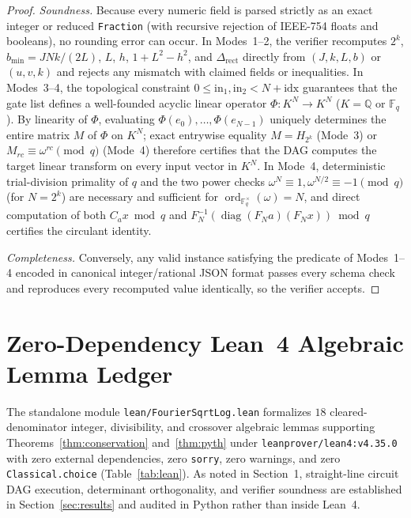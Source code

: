 \documentclass[11pt,a4paper]{article}
\theoremstyle{definition}
\theoremstyle{remark}
\newcommand{\QQ}{\mathbb{Q}}
\newcommand{\FF}{\mathbb{F}}
\newcommand{\diag}{\operatorname{diag}}
\begin{document}
\begin{proof}
\emph{Soundness.} Because every numeric field is parsed strictly as an exact integer or reduced \texttt{Fraction} (with recursive rejection of IEEE-754 floats and booleans), no rounding error can occur. In Modes~1--2, the verifier recomputes $2^k$, $b_{\min} = JNk/(2L)$, $L$, $h$, $1+L^2-h^2$, and $\Delta_{\mathrm{rect}}$ directly from $(J,k,L,b)$ or $(u,v,k)$ and rejects any mismatch with claimed fields or inequalities. In Modes~3--4, the topological constraint $0 \le \mathrm{in}_1, \mathrm{in}_2 < N + \mathrm{idx}$ guarantees that the gate list defines a well-founded acyclic linear operator $\Phi : K^N \to K^N$ ($K = \QQ$ or $\FF_q$). By linearity of $\Phi$, evaluating $\Phi(e_0),\dots,\Phi(e_{N-1})$ uniquely determines the entire matrix $M$ of $\Phi$ on $K^N$; exact entrywise equality $M = H_{2^k}$ (Mode~3) or $M_{rc} \equiv \omega^{rc} \pmod q$ (Mode~4) therefore certifies that the DAG computes the target linear transform on every input vector in $K^N$. In Mode~4, deterministic trial-division primality of $q$ and the two power checks $\omega^N \equiv 1, \omega^{N/2} \equiv -1 \pmod q$ (for $N = 2^k$) are necessary and sufficient for $\operatorname{ord}_{\FF_q^\times}(\omega) = N$, and direct computation of both $C_a x \bmod q$ and $F_N^{-1}(\diag(F_N a)(F_N x)) \bmod q$ certifies the circulant identity.

\emph{Completeness.} Conversely, any valid instance satisfying the predicate of Modes~1--4 encoded in canonical integer/rational JSON format passes every schema check and reproduces every recomputed value identically, so the verifier accepts.
\end{proof}

\section{Zero-Dependency Lean~4 Algebraic Lemma Ledger}\label{sec:lean}

The standalone module \texttt{lean/FourierSqrtLog.lean} formalizes $18$ cleared-denominator integer, divisibility, and crossover algebraic lemmas supporting Theorems~\ref{thm:conservation} and~\ref{thm:pyth} under \texttt{leanprover/lean4:v4.35.0} with zero external dependencies, zero \texttt{sorry}, zero warnings, and zero \texttt{Classical.choice} (Table~\ref{tab:lean}). As noted in Section~1, straight-line circuit DAG execution, determinant orthogonality, and verifier soundness are established in Section~\ref{sec:results} and audited in Python rather than inside Lean~4.
\end{document}
